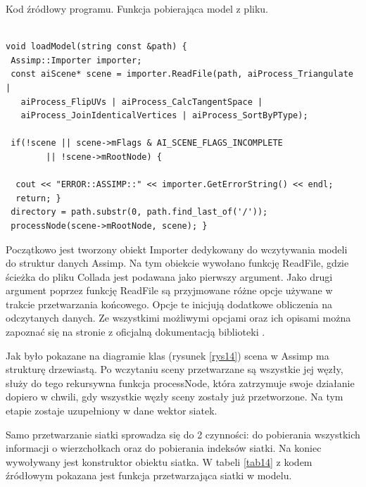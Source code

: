 \begin{table}[H]
\caption{Kod źródłowy programu. Funkcja pobierająca model z pliku.}
\label{tab13}
\begin{lstlisting}[frame=single]  % Start your code-block

void loadModel(string const &path) {
 Assimp::Importer importer;
 const aiScene* scene = importer.ReadFile(path, aiProcess_Triangulate |
   aiProcess_FlipUVs | aiProcess_CalcTangentSpace | 
   aiProcess_JoinIdenticalVertices | aiProcess_SortByPType);

 if(!scene || scene->mFlags & AI_SCENE_FLAGS_INCOMPLETE 
    	|| !scene->mRootNode) {
  
  cout << "ERROR::ASSIMP::" << importer.GetErrorString() << endl;
  return; }
 directory = path.substr(0, path.find_last_of('/'));
 processNode(scene->mRootNode, scene); }
\end{lstlisting}
\end{table}

Początkowo jest tworzony obiekt Importer dedykowany do wczytywania modeli do struktur danych Assimp. Na tym obiekcie wywołano funkcję ReadFile, gdzie ścieżka do pliku Collada jest podawana jako pierwszy argument. Jako drugi argument poprzez funkcję ReadFile są przyjmowane różne opcje używane w trakcie przetwarzania końcowego. Opcje te inicjują dodatkowe obliczenia na odczytanych danych. Ze wszystkimi możliwymi opcjami oraz ich opisami można zapoznać się na stronie z oficjalną dokumentacją biblioteki \cite{assimpDocumentation}.

Jak było pokazane na diagramie klas (rysunek \ref{rys14}) scena w Assimp ma strukturę drzewiastą. Po wczytaniu sceny przetwarzane są wszystkie jej węzły, służy do tego rekursywna funkcja processNode, która zatrzymuje swoje działanie dopiero w chwili, gdy wszystkie węzły sceny zostały już przetworzone. Na tym etapie zostaje uzupełniony w dane wektor siatek.

Samo przetwarzanie siatki sprowadza się do 2 czynności: do pobierania wszystkich informacji o wierzchołkach oraz do pobierania indeksów siatki. Na koniec wywoływany jest konstruktor obiektu siatka. W tabeli \ref{tab14} z kodem źródłowym pokazana jest funkcja przetwarzająca siatki w modelu.


